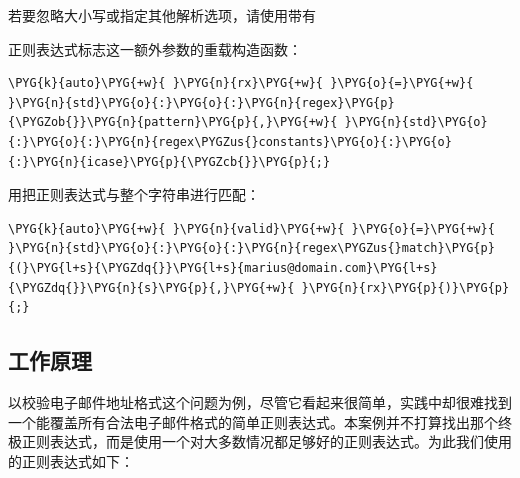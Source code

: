 
若要忽略大小写或指定其他解析选项，请使用带有



正则表达式标志这一额外参数的重载构造函数：



\begin{codeblockbg}
\begin{Verbatim}[commandchars=\\\{\},breaklines=true,breakanywhere=true,fontsize=\codefont,xleftmargin=17bp]
\PYG{k}{auto}\PYG{+w}{ }\PYG{n}{rx}\PYG{+w}{ }\PYG{o}{=}\PYG{+w}{ }\PYG{n}{std}\PYG{o}{:}\PYG{o}{:}\PYG{n}{regex}\PYG{p}{\PYGZob{}}\PYG{n}{pattern}\PYG{p}{,}\PYG{+w}{ }\PYG{n}{std}\PYG{o}{:}\PYG{o}{:}\PYG{n}{regex\PYGZus{}constants}\PYG{o}{:}\PYG{o}{:}\PYG{n}{icase}\PYG{p}{\PYGZcb{}}\PYG{p}{;}
\end{Verbatim}
\end{codeblockbg}



用把正则表达式与整个字符串进行匹配：



\begin{codeblockbg}
\begin{Verbatim}[commandchars=\\\{\},breaklines=true,breakanywhere=true,fontsize=\codefont,xleftmargin=17bp]
\PYG{k}{auto}\PYG{+w}{ }\PYG{n}{valid}\PYG{+w}{ }\PYG{o}{=}\PYG{+w}{ }\PYG{n}{std}\PYG{o}{:}\PYG{o}{:}\PYG{n}{regex\PYGZus{}match}\PYG{p}{(}\PYG{l+s}{\PYGZdq{}}\PYG{l+s}{marius@domain.com}\PYG{l+s}{\PYGZdq{}}\PYG{n}{s}\PYG{p}{,}\PYG{+w}{ }\PYG{n}{rx}\PYG{p}{)}\PYG{p}{;}
\end{Verbatim}
\end{codeblockbg}



\subsection{工作原理}



以校验电子邮件地址格式这个问题为例，尽管它看起来很简单，实践中却很难找到一个能覆盖所有合法电子邮件格式的简单正则表达式。本案例并不打算找出那个终极正则表达式，而是使用一个对大多数情况都足够好的正则表达式。为此我们使用的正则表达式如下：



